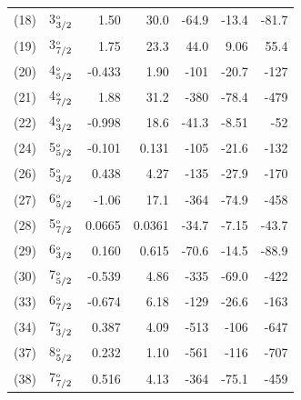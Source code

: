 \documentclass[10pt,a4paper, twoside]{report}
\begin{document}
\begin{table}[t]
\begin{tabular}{l@{\hspace{0.01cm}}c@{\hspace{0.5cm}}r@{\hspace{0.5cm}}r@{\hspace{0.5cm}}r@{\hspace{0.5cm}}r@{\hspace{0.5cm}}r}
(18)  & 3$_{3/2}^{\rm_o}$  & 1.50 & 30.0 & -64.9 & -13.4 & -81.7 \\
(19) & 3$_{7/2}^{\rm_o}$   & 1.75 & 23.3 & 44.0 & 9.06& 55.4 \\
(20) & 4$_{5/2}^{\rm_o}$   &  -0.433 & 1.90 & -101 & -20.7 & -127  \\
(21) & 4$_{7/2}^{\rm_o}$   &  1.88 & 31.2 & -380 & -78.4 & -479 \\
(22) & 4$_{3/2}^{\rm_o}$  &   -0.998 & 18.6 & -41.3 & -8.51& -52 \\
(24) & 5$_{5/2}^{\rm_o}$  &   -0.101 & 0.131 & -105 & -21.6 & -132 \\
(26) & 5$_{3/2}^{\rm_o}$   &   0.438 & 4.27 & -135 & -27.9 & -170 \\
(27) & 6$_{5/2}^{\rm_o}$  &   -1.06 & 17.1 & -364 & -74.9 & -458 \\
(28) & 5$_{7/2}^{\rm_o}$  &  0.0665 & 0.0361 & -34.7 & -7.15 & -43.7 \\
(29) & 6$_{3/2}^{\rm_o}$    &  0.160 & 0.615 & -70.6 & -14.5 & -88.9 \\
(30) & 7$_{5/2}^{\rm_o}$    &  -0.539 & 4.86 & -335 & -69.0 & -422\\
(33) & 6$_{7/2}^{\rm_o}$   &   -0.674 & 6.18 & -129 & -26.6 & -163 \\
(34) & 7$_{3/2}^{\rm_o}$   &  0.387 & 4.09 & -513 & -106 & -647 \\
(37) & 8$_{5/2}^{\rm_o}$   &  0.232 & 1.10 & -561 & -116 & -707\\
(38) & 7$_{7/2}^{\rm_o}$  &  0.516 & 4.13 & -364 & -75.1 & -459 \\
\bottomrule
\bottomrule
\end{tabular}

\end{table}
\end{document}
